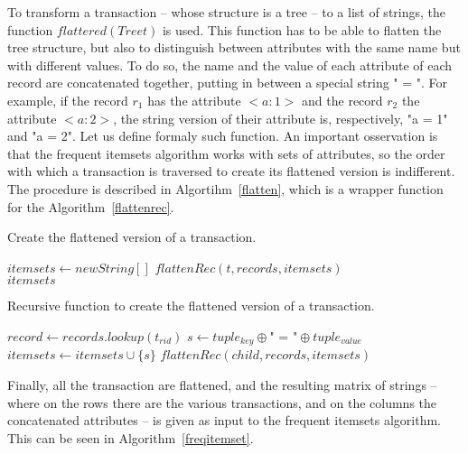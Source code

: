 \documentclass{acm_proc_article-sp-sigmod09}
\begin{document}
To transform a transaction -- whose structure is a tree -- to a list of strings, the function $flattered(Tree t)$ is used. This function has to be able to flatten the tree structure, but also to distinguish between attributes with the same name but with different values. To do so, the name and the value of each attribute of each record are concatenated together, putting in between a special string " = ". For example, if the record $r_1$ has the attribute $<a \colon 1>$ and the record $r_2$ the attribute $<a \colon 2>$, the string version of their attribute is, respectively, "a = 1" and "a = 2". Let us define formaly such function. An important osservation is that the frequent itemsets algorithm works with sets of attributes, so the order with which a transaction is traversed to create its flattened version is indifferent. The procedure is described in Algortihm~\ref{flatten}, which is a wrapper function for the Algorithm~\ref{flattenrec}.

\begin{algorithm}
\caption{Create the flattened version of a transaction.}
\label{flatten}
\begin{algorithmic}[1]
\State $itemsets \gets new String[]$
\State $flattenRec(t, records, itemsets)$ \\
\Return $itemsets$
\EndFunction
\end{algorithmic}
\end{algorithm}

\begin{algorithm}
\caption{Recursive function to create the flattened version of a transaction.}
\label{flattenrec}
\begin{algorithmic}[1]
\State $record \gets records.lookup(t_{rid})$
	\State $s \gets tuple_{key} \oplus \text{" = "} \oplus tuple_{value}$
	\State $itemsets \gets itemsets \cup \{s\}$
\EndFor
{}
	\State $flattenRec(child, records, itemsets)$
\EndFor
\EndFunction
\end{algorithmic}
\end{algorithm}

Finally, all the transaction are flattened, and the resulting matrix of strings -- where on the rows there are the various transactions, and on the columns the concatenated attributes -- is given as input to the frequent itemsets algorithm. This can be seen in Algorithm~\ref{freqitemset}.
\end{document}
